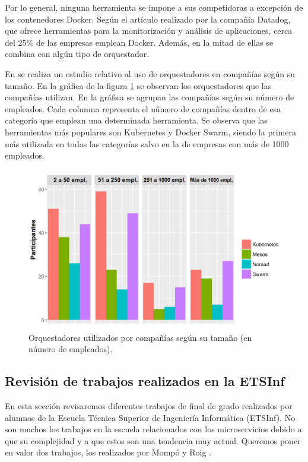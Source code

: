 \documentclass[11pt,spanish,listoffigures]{tfgetsinf}
\begin{document}
Por lo general, ninguna herramienta se impone a sus competidoras a excepción de los contenedores Docker. Según el artículo \cite{Datadog2018} realizado por la compañía Datadog, que ofrece herramientas para la monitorización y análisis de aplicaciones, cerca del 25\% de las empresas emplean Docker. Además, en la mitad de ellas se combina con algún tipo de orquestador. 

En \cite{Ryan2016} se realiza un estudio relativo al uso de orquestadores en compañías según su tamaño. En la gráfica de la figura \ref{fig:Comparativa_Orquestadores_ES} se observan los orquestadores que las compañías utilizan. En la gráfica se agrupan las compañías según su número de empleados. Cada columna representa el número de compañías dentro de esa categoría que emplean una determinada herramienta. Se observa que las herramientas más populares son Kubernetes y Docker Swarm, siendo la primera más utilizada en todas las categorías salvo en la de empresas con más de 1000 empleados.

\begin{figure}[h]
\centering
\includegraphics[scale=0.6]{Comparativa_Orquestadores_ES} 
\caption{Orquestadores utilizados por compañías según su tamaño (en número de empleados).}
\label{fig:Comparativa_Orquestadores_ES}
\end{figure}

\subsection{Revisión de trabajos realizados en la ETSInf}

En esta sección revisaremos diferentes trabajos de final de grado realizados por alumnos de la Escuela Técnica Superior de Ingeniería Informática (ETSInf). No son muchos los trabajos en la escuela relacionados con los microservicios debido a que su complejidad y a que estos son una tendencia muy actual. Queremos poner en valor dos trabajos, los realizados por Mompó \cite{Mompo2017} y Roig \cite{Roig2017}.
\end{document}
